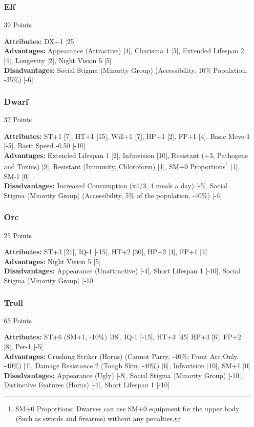 \begin{multicols*}{3}
	\subsubsection*{Elf}
	\begin{flushright}
		39 Points
	\end{flushright}
	\textbf{Attributes:} 
	DX+1 [25]
	\\\textbf{Advantages:} 
	Appearance (Attractive) [4], Charisma 1 [5], Extended Lifespan 2 [4], Longevity [2], Night Vision 5 [5]
	\\\textbf{Disadvantages:} 
	Social Stigma (Minority Group) (Accessibility, 10\% Population, -35\%) [-6]
	
	\subsubsection*{Dwarf}
	\begin{flushright}
		32 Points
	\end{flushright}
	\textbf{Attributes:}
	ST+1 [7], HT+1 [15], Will+1 [7], HP+1 [2], FP+1 [4], Basic Move-1 [-5]. Basic Speed -0.50 [-10]
	\\\textbf{Advantages:} 
	Extended Lifespan 1 [2], Infravision [10], Resistant (+3, Pathogens and Toxins) [9], Resistant (Immunity, Chloroform) [1], SM+0 Proportions\footnote{SM+0 Proportions: Dwarves can use SM+0 equipment for the upper body (Such as swords and firearms) without any penalties.} [1], SM-1 [0]
	\\\textbf{Disadvantages:} 
	Increased Consumption (x4/3, 4 meals a day) [-5], Social Stigma (Minority Group) (Accessibility, 5\% of the population, -40\%) [-6]
	
	\subsubsection*{Orc}
	\begin{flushright}
		25 Points
	\end{flushright}
	\textbf{Attributes:}
	ST+3 [21], IQ-1 [-15], HT+2 [30], HP+2 [4], FP+1 [4]
	\\\textbf{Advantages:} 
	Night Vision 5 [5]
	\\\textbf{Disadvantages:} 
	Appearance (Unattractive) [-4], Short Lifespan 1 [-10], Social Stigma (Minority Group) [-10]
	
	\subsubsection*{Troll}
	\begin{flushright}
		65 Points
	\end{flushright}
	\textbf{Attributes:}
	ST+6 (SM+1, -10\%) [38], IQ-1 [-15], HT+3 [45] HP+3 [6], FP+2 [8], Per-1 [-5]
	\\\textbf{Advantages:} 
	Crushing Striker (Horns) (Cannot Parry, -40\%; Front Arc Only, -40\%) [1], Damage Resistance 2 (Tough Skin, -40\%) [6], Infravision [10], SM+1 [0]
	\\\textbf{Disadvantages:} 
	Appearance (Ugly) [-8], Social Stigma (Minority Group) [-10], Distinctive Features (Horns) [-1], Short Lifespan 1 [-10]
	

\end{multicols*}
